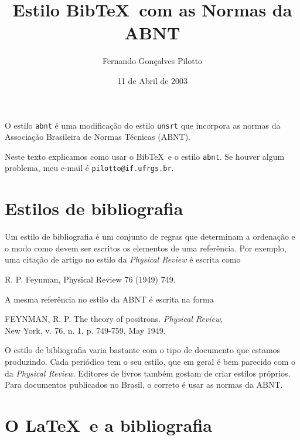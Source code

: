 \documentclass[a4paper,12pt]{article}
\newcommand{\ca}{\c{c}\~ao}
\begin{document}
	
	\title{Estilo Bib\TeX\ com as Normas da ABNT}
	\author{Fernando Gon\c{c}alves Pilotto} 
	\date{11 de Abril de 2003}
	\maketitle
	
	O estilo \verb+abnt+ \'e uma modifica{\ca} do estilo \verb+unsrt+ que
	incorpora as normas da Associa{\ca} Brasileira de Normas T\'ecnicas (ABNT).
	
	Neste texto explicamos como usar o Bib\TeX\ e o estilo \verb+abnt+.
	Se houver algum problema, meu e-mail \'e
	\verb+pilotto@if.ufrgs.br+.
	
	
	\tableofcontents
	
	\newpage
	
	
	
	\section{Estilos de bibliografia}
	
	
	Um estilo de bibliografia \'e um conjunto de regras que determinam
	a ordena{\ca} e o modo como devem ser escritos os elementos 
	de uma refer\^encia. Por exemplo, uma cita{\ca} de artigo no estilo
	da {\it Physical Review} \'e escrita como
	\begin{center}
		R. P. Feynman, Physical Review 76 (1949) 749.
	\end{center}
	A mesma refer\^encia no estilo da ABNT \'e escrita na forma
	\begin{center}
		\parbox{0.8\textwidth}{
			FEYNMAN, R. P. The theory of positrons. {\it Physical Review}, \\
			New York, v. 76, n. 1, p. 749-759, May 1949.}
	\end{center}
	O estilo de bibliografia varia bastante com o tipo de documento que
	estamos produzindo.
	Cada peri\'odico tem o seu estilo, que em geral \'e bem 
	parecido com o da {\it Physical Review}. Editores de livros
	tamb\'em gostam de criar estilos pr\'oprios. Para documentos
	publicados no Brasil, o correto \'e usar as normas da ABNT.
	
	
	
	
	\section{O \LaTeX\ e a bibliografia}
	
\end{document}
